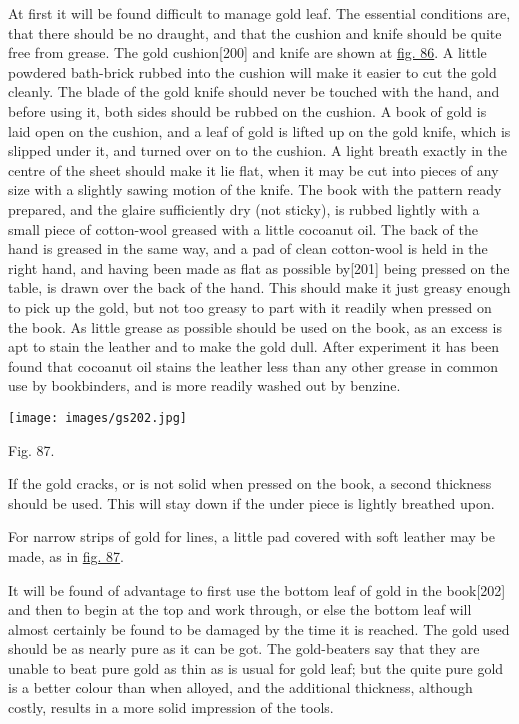 \documentclass[
]{article}
\begin{document}
At first it will be found difficult to manage gold leaf. The essential
conditions are, that there should be no draught, and that the cushion
and knife should be quite free from grease. The gold
cushion{\protect\hypertarget{Page_200}{}{{[}200{]}}} and knife are shown
at \protect\hyperlink{Fig_86}{fig. 86}. A little powdered bath-brick
rubbed into the cushion will make it easier to cut the gold cleanly. The
blade of the gold knife should never be touched with the hand, and
before using it, both sides should be rubbed on the cushion. A book of
gold is laid open on the cushion, and a leaf of gold is lifted up on the
gold knife, which is slipped under it, and turned over on to the
cushion. A light breath exactly in the centre of the sheet should make
it lie flat, when it may be cut into pieces of any size with a slightly
sawing motion of the knife. The book with the pattern ready prepared,
and the glaire sufficiently dry (not sticky), is rubbed lightly with a
small piece of cotton-wool greased with a little cocoanut oil. The back
of the hand is greased in the same way, and a pad of clean cotton-wool
is held in the right hand, and having been made as flat as possible
by{\protect\hypertarget{Page_201}{}{{[}201{]}}} being pressed on the
table, is drawn over the back of the hand. This should make it just
greasy enough to pick up the gold, but not too greasy to part with it
readily when pressed on the book. As little grease as possible should be
used on the book, as an excess is apt to stain the leather and to make
the gold dull. After experiment it has been found that cocoanut oil
stains the leather less than any other grease in common use by
bookbinders, and is more readily washed out by benzine.

\protect\hypertarget{Fig_87}{}{}
\texttt{[image: images/gs202.jpg]}

Fig. 87.

If the gold cracks, or is not solid when pressed on the book, a second
thickness should be used. This will stay down if the under piece is
lightly breathed upon.

For narrow strips of gold for lines, a little pad covered with soft
leather may be made, as in \protect\hyperlink{Fig_87}{fig. 87}.

It will be found of advantage to first use the bottom leaf of gold in
the book{\protect\hypertarget{Page_202}{}{{[}202{]}}} and then to begin
at the top and work through, or else the bottom leaf will almost
certainly be found to be damaged by the time it is reached. The gold
used should be as nearly pure as it can be got. The gold-beaters say
that they are unable to beat pure gold as thin as is usual for gold
leaf; but the quite pure gold is a better colour than when alloyed, and
the additional thickness, although costly, results in a more solid
impression of the tools.
\end{document}
